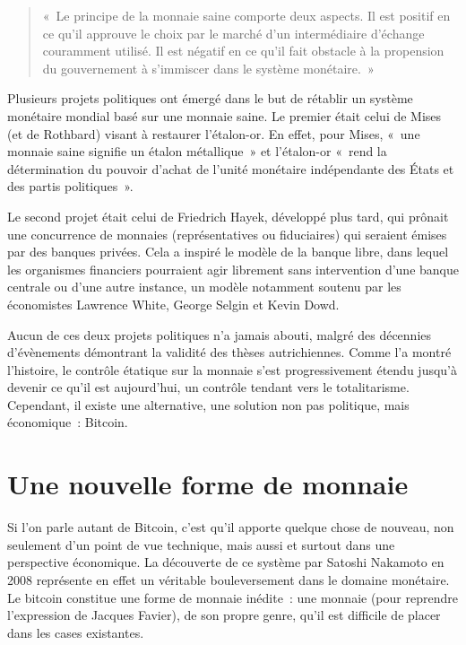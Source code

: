 \begin{quote}
«~Le principe de la monnaie saine comporte deux aspects. Il est positif en ce qu'il approuve le choix par le marché d'un intermédiaire d'échange couramment utilisé. Il est négatif en ce qu'il fait obstacle à la propension du gouvernement à s'immiscer dans le système monétaire.~»
\end{quote} %

Plusieurs projets politiques ont émergé dans le but de rétablir un système monétaire mondial basé sur une monnaie saine. Le premier était celui de Mises (et de Rothbard) visant à restaurer l'étalon-or. En effet, pour Mises, «~une monnaie saine signifie un étalon métallique~» et l'étalon-or «~rend la détermination du pouvoir d'achat de l'unité monétaire indépendante des États et des partis politiques~».

Le second projet était celui de Friedrich Hayek, développé plus tard, qui prônait une concurrence de monnaies (représentatives ou fiduciaires) qui seraient émises par des banques privées. Cela a inspiré le modèle de la banque libre, dans lequel les organismes financiers pourraient agir librement sans intervention d'une banque centrale ou d'une autre instance, un modèle notamment soutenu par les économistes Lawrence White, George Selgin et Kevin Dowd.

Aucun de ces deux projets politiques n'a jamais abouti, malgré des décennies d'évènements démontrant la validité des thèses autrichiennes. Comme l'a montré l'histoire, le contrôle étatique sur la monnaie s'est progressivement étendu jusqu'à devenir ce qu'il est aujourd'hui, un contrôle tendant vers le totalitarisme. Cependant, il existe une alternative, une solution non pas politique, mais économique~: Bitcoin.

\section*{Une nouvelle forme de monnaie}

Si l'on parle autant de Bitcoin, c'est qu'il apporte quelque chose de nouveau, non seulement d'un point de vue technique, mais aussi et surtout dans une perspective économique. La découverte de ce système par Satoshi Nakamoto en 2008 représente en effet un véritable bouleversement dans le domaine monétaire. Le bitcoin constitue une forme de monnaie inédite~: une monnaie  (pour reprendre l'expression de Jacques Favier), de son propre genre, qu'il est difficile de placer dans les cases existantes.

